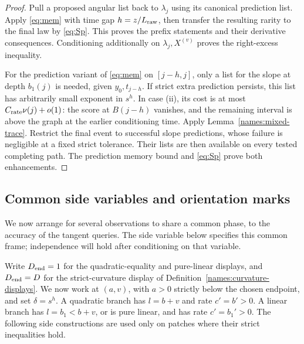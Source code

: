\begin{proof}
Pull a proposed angular list back to \(\lambda_j\) using its
canonical prediction list. Apply \eqref{eq:mem} with time gap
\(h=z/L_{\rm raw}\), then transfer the resulting rarity to the
final law by \eqref{eq:Sp}. This proves the prefix statements and
their derivative consequences. Conditioning additionally on
\(\lambda_j,X^{(v)}\) proves the right-excess inequality.

For the prediction variant of \eqref{eq:mem} on \([j-h,j]\),
only a list for the slope at depth \(b_1(j)\) is needed, given
\(y_0,t_{j-h}\). If strict extra prediction persists, this list
has arbitrarily small exponent in \(s^h\). In case (ii), its
cost is at most \(C_{\rm rate}\nu(j)+o(1)\): the score at
\(B(j-h)\) vanishes, and the remaining interval is above the
graph at the earlier conditioning time. Apply
Lemma~\ref{names:mixed-trace}. Restrict the final event to
successful slope predictions, whose failure is negligible at a
fixed strict tolerance. Their lists are then available on every
tested completing path. The prediction memory bound and
\eqref{eq:Sp} prove both enhancements.
\end{proof}

\subsection{Common side variables and orientation marks}

We now arrange for several observations to share a common phase, to the
accuracy of the tangent queries. The side variable below specifies this
common frame; independence will hold after conditioning on that variable.

Write $D_{\rm end}=1$ for the quadratic-equality and pure-linear
displays, and $D_{\rm end}=D$ for the strict-curvature display of
Definition~\ref{names:curvature-displays}.
We now work at \((a,v)\), with \(a>0\) strictly below the chosen
endpoint, and set \(\delta=s^h\). A quadratic branch has
\(l=b+v\) and rate \(c'=b'>0\). A linear branch has
\(l=b_1<b+v\), or is pure linear, and has rate \(c'=b_1'>0\).
The following side constructions are used only on patches where
their strict inequalities hold.


